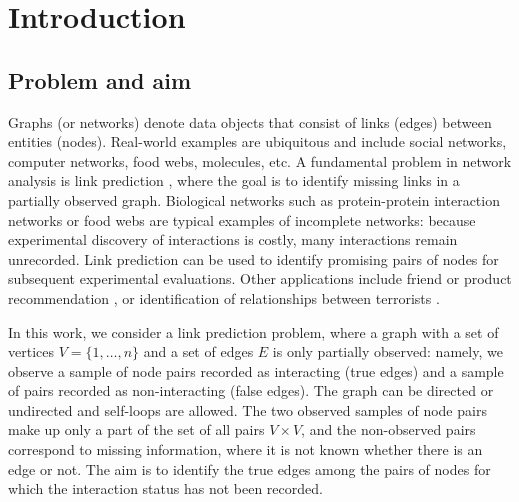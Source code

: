 \documentclass[a4paper, 11pt]{article}
\theoremstyle{remark}
\begin{document}
\section{Introduction}

\subsection{Problem and aim} 

Graphs (or networks) denote data objects that consist of links (edges) between entities (nodes). Real-world examples are ubiquitous and include social networks, computer networks, food webs, molecules, etc. 
A fundamental problem in network analysis is link prediction \citep{lu2011link}, where the goal is to %
identify missing links 
in a partially observed graph. 
Biological networks such as protein-protein interaction networks \citep{PPI19} or food webs \citep{foodweb20} are typical examples of incomplete networks: because experimental discovery of interactions is costly, many interactions remain unrecorded. Link prediction can be used to identify promising pairs of nodes for subsequent experimental evaluations. Other applications include friend or product recommendation \citep{li13}, or identification of relationships between terrorists \citep{clauset2008hierarchical}. 


In this work, we consider a link prediction problem, where a graph with a set of vertices $V = \{1, \dots, n \}$ and a set of edges $E$ is only partially observed: namely, we observe a sample of node pairs recorded as interacting (true edges) and a sample of pairs recorded as non-interacting (false edges). The graph can be directed or undirected and self-loops are allowed. The two observed samples of node pairs make up only a part of the set of all pairs $V \times V$, and the non-observed pairs correspond to missing information, where it is not known whether there is an edge or not. The aim is to identify the true edges among the pairs of nodes for which the interaction status has not been recorded.
\end{document}
